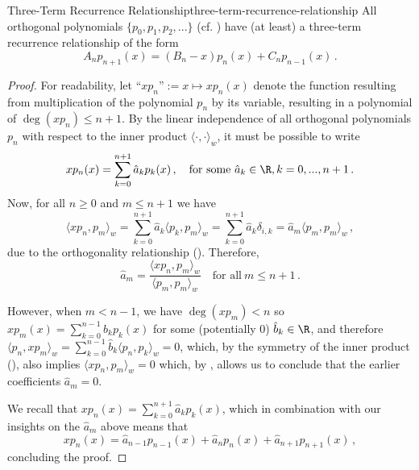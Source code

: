 \begin{theorem}{Three-Term Recurrence Relationship}{three-term-recurrence-relationship}
  All orthogonal polynomials $\{p_0, p_1, p_2, ...\}$ (cf. ) have (at least) a three-term recurrence relationship of the form
  $$A_n p_{n+1}(x) = (B_n - x) p_n(x) + C_n p_{n-1}(x)\,.$$
\end{theorem}
\begin{proof}
  For readability, let ``$x p_n$''$:= x \mapsto x p_n(x)$ denote the function resulting from multiplication of the polynomial $p_n$ by its variable, resulting in a polynomial of $\deg(x p_n) \le n+1$.
  By the linear independence of all orthogonal polynomials $p_n$ with respect to the inner product $\langle \cdot, \cdot \rangle_w$, it must be possible to write
  $$x p_n(x) = \sum_{k=0}^{n+1} \hat{a}_k p_k(x)\,,\quad \text{for some}~\hat{a}_k \in \R, k=0, ..., n+1\,.$$
  Now, for all $n \ge 0$ and $m \le n+1$ we have
  $$\langle xp_n, p_m \rangle_w = \sum_{k=0}^{n+1} \hat{a}_k \langle p_k, p_m \rangle_w = \sum_{k=0}^{n+1} \hat{a}_k \delta_{i,k} = \hat{a}_m \langle p_m, p_m \rangle_w\,,$$
  due to the orthogonality relationship ().
  Therefore,
  \begin{equation}
    \hat{a}_m = \frac{\langle xp_n, p_m \rangle_w}{\langle p_m, p_m \rangle_w} \quad\text{for all}~m \le n+1\,.
    \label{eq:three-term-step}
  \end{equation}

  However, when \underline{$m < n-1$}, we have $\deg(xp_m) < n$ so $x p_m(x) = \sum_{k=0}^{n-1} \hat{b}_k p_k(x)$ for some (potentially 0) $\hat{b}_k \in \R$, and therefore $\langle p_n, xp_m \rangle_w = \sum_{k=0}^{n-1} \hat{b}_k \langle p_n, p_k \rangle_w = 0$,
  which, by the symmetry of the inner product (), also implies $\langle x p_n, p_m \rangle_w = 0$ which, by , allows us to conclude that the earlier coefficients $\hat{a}_m = 0$.


  We recall that $xp_n(x) = \sum_{k=0}^{n+1} \hat{a}_k p_k(x)$, which in combination with our insights on the $\hat{a}_m$ above means that
  $$xp_n(x) = \hat{a}_{n-1} p_{n-1}(x) + \hat{a}_{n} p_n(x) + \hat{a}_{n+1} p_{n+1}(x)\,,$$
  concluding the proof.
\end{proof}

